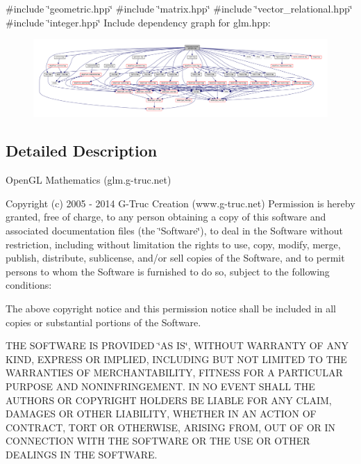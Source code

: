 {\ttfamily \#include \char`\"{}geometric.\+hpp\char`\"{}}\newline
{\ttfamily \#include \char`\"{}matrix.\+hpp\char`\"{}}\newline
{\ttfamily \#include \char`\"{}vector\+\_\+relational.\+hpp\char`\"{}}\newline
{\ttfamily \#include \char`\"{}integer.\+hpp\char`\"{}}\newline
Include dependency graph for glm.\+hpp\+:
\nopagebreak
\begin{figure}[H]
\begin{center}
\leavevmode
\includegraphics[width=350pt]{third-party_2include_2glm_2glm_8hpp__incl}
\end{center}
\end{figure}


\subsection{Detailed Description}
Open\+GL Mathematics (glm.\+g-\/truc.\+net)

Copyright (c) 2005 -\/ 2014 G-\/\+Truc Creation (www.\+g-\/truc.\+net) Permission is hereby granted, free of charge, to any person obtaining a copy of this software and associated documentation files (the \char`\"{}\+Software\char`\"{}), to deal in the Software without restriction, including without limitation the rights to use, copy, modify, merge, publish, distribute, sublicense, and/or sell copies of the Software, and to permit persons to whom the Software is furnished to do so, subject to the following conditions\+:

The above copyright notice and this permission notice shall be included in all copies or substantial portions of the Software.

T\+HE S\+O\+F\+T\+W\+A\+RE IS P\+R\+O\+V\+I\+D\+ED \char`\"{}\+A\+S I\+S\char`\"{}, W\+I\+T\+H\+O\+UT W\+A\+R\+R\+A\+N\+TY OF A\+NY K\+I\+ND, E\+X\+P\+R\+E\+SS OR I\+M\+P\+L\+I\+ED, I\+N\+C\+L\+U\+D\+I\+NG B\+UT N\+OT L\+I\+M\+I\+T\+ED TO T\+HE W\+A\+R\+R\+A\+N\+T\+I\+ES OF M\+E\+R\+C\+H\+A\+N\+T\+A\+B\+I\+L\+I\+TY, F\+I\+T\+N\+E\+SS F\+OR A P\+A\+R\+T\+I\+C\+U\+L\+AR P\+U\+R\+P\+O\+SE A\+ND N\+O\+N\+I\+N\+F\+R\+I\+N\+G\+E\+M\+E\+NT. IN NO E\+V\+E\+NT S\+H\+A\+LL T\+HE A\+U\+T\+H\+O\+RS OR C\+O\+P\+Y\+R\+I\+G\+HT H\+O\+L\+D\+E\+RS BE L\+I\+A\+B\+LE F\+OR A\+NY C\+L\+A\+IM, D\+A\+M\+A\+G\+ES OR O\+T\+H\+ER L\+I\+A\+B\+I\+L\+I\+TY, W\+H\+E\+T\+H\+ER IN AN A\+C\+T\+I\+ON OF C\+O\+N\+T\+R\+A\+CT, T\+O\+RT OR O\+T\+H\+E\+R\+W\+I\+SE, A\+R\+I\+S\+I\+NG F\+R\+OM, O\+UT OF OR IN C\+O\+N\+N\+E\+C\+T\+I\+ON W\+I\+TH T\+HE S\+O\+F\+T\+W\+A\+RE OR T\+HE U\+SE OR O\+T\+H\+ER D\+E\+A\+L\+I\+N\+GS IN T\+HE S\+O\+F\+T\+W\+A\+RE.

